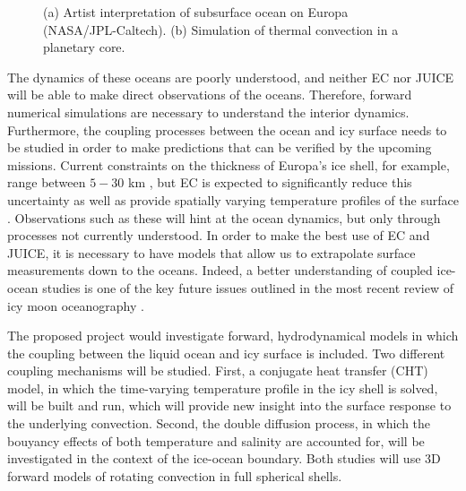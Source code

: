 \documentclass{article}
\begin{document}
\begin{figure}
	\begin{center}
		\quad
	\end{center}
	\caption{(a) Artist interpretation of subsurface ocean on Europa (NASA/JPL-Caltech). (b) Simulation of thermal convection in a planetary core\citep{tO25}.}
	\label{f:}
\end{figure}
The dynamics of these oceans are poorly understood, and neither EC nor JUICE will be able to make direct observations of the oceans. 
Therefore, forward numerical simulations are necessary to understand the interior dynamics. 
Furthermore, the coupling processes between the ocean and icy surface needs to be studied in order to make predictions that can be verified by the upcoming missions.
Current constraints on the thickness of Europa's ice shell, for example, range between $5-30$ km \citep{sV18}, but EC is expected to significantly reduce this uncertainty as well as provide spatially varying temperature profiles of the surface \citep{kS20}. 
Observations such as these will hint at the ocean dynamics, but only through processes not currently understood. In order to make the best use of EC and JUICE, it is necessary to have models that allow us to extrapolate surface measurements down to the oceans.
Indeed, a better understanding of coupled ice-ocean studies is one of the key future issues outlined in the most recent review of icy moon oceanography \citep{kS24}. 

The proposed project would investigate forward, hydrodynamical models in which the coupling between the liquid ocean and icy surface is included. Two different coupling mechanisms will be studied. 
First, a conjugate heat transfer (CHT) model, in which the time-varying temperature profile in the icy shell is solved, will be built and run, which will provide new insight into the surface response to the underlying convection. Second, the double diffusion process, in which the bouyancy effects of both temperature and salinity are accounted for, will be investigated in the context of the ice-ocean boundary. Both studies will use 3D forward models of rotating convection in full spherical shells. 
\end{document}
